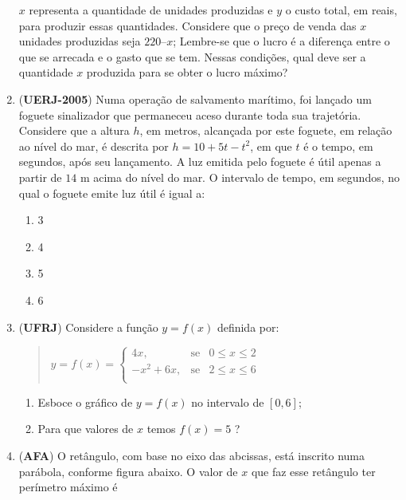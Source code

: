 \begin{enumerate}
\(x\) representa a quantidade de unidades produzidas e \(y\) o custo total, em reais, para produzir essas quantidades.
Considere que o preço de venda das \(x\) unidades produzidas seja \(220 – x\); Lembre-se que o lucro é a diferença entre o que se arrecada e o gasto que se tem. Nessas condições, qual deve ser a quantidade \(x\) produzida para se obter o lucro máximo?

\item (\textbf{UERJ-2005}) Numa operação de salvamento marítimo, foi lançado um foguete sinalizador que permaneceu aceso durante toda sua trajetória. Considere que a altura \(h\), em metros, alcançada por este foguete, em relação ao nível do mar, é descrita por \(h = 10 + 5t - t^2\), em que \(t\) é o tempo, em segundos, após seu lançamento. A luz emitida pelo foguete é útil apenas a partir de \(14\) m acima do nível do mar. O intervalo de tempo, em segundos, no qual o foguete emite luz útil é igual a:
\begin{enumerate}
\item 3
\item 4
\item 5
\item 6
\end{enumerate}

\item (\textbf{UFRJ}) Considere a função \(y = f(x)\) definida por:
\begin{quote}

\(y = f(x) = \left\{ \begin{array}{rlll} 4x, & \text{se} & 0 \leq x \leq 2 \\ -x^2+6x, & \text{se} & 2 \leq x \leq 6 \\ \end{array} \right.\)
\end{quote}
\begin{enumerate}
\item {} 
Esboce o gráfico de \(y = f(x)\) no intervalo de \([0,6]\);

\item {} 
Para que valores de \(x\) temos \(f(x) = 5\) ?

\end{enumerate}

\item (\textbf{AFA}) O retângulo, com base no eixo das abcissas, está inscrito numa parábola, conforme figura abaixo. O valor de  \(x\)  que faz esse retângulo ter perímetro máximo é
\begin{figure}[H]
\centering


\end{figure}
\end{enumerate}
